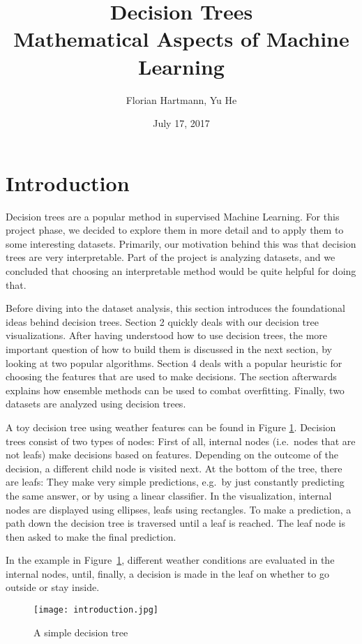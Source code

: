\documentclass[a4paper]{article}
\title{Decision Trees\\\large{Mathematical Aspects of Machine Learning}}
\author{Florian Hartmann, Yu He}
\date{July 17, 2017}
\begin{document}
\maketitle

\section{Introduction}

Decision trees are a popular method in supervised Machine Learning. For this project phase, we decided to explore them in more detail and to apply them to some interesting datasets. Primarily, our motivation behind this was that decision trees are very interpretable. Part of the project is analyzing datasets, and we concluded that choosing an interpretable method would be quite helpful for doing that.

Before diving into the dataset analysis, this section introduces the foundational ideas behind decision trees. Section 2 quickly deals with our decision tree visualizations. After having understood how to use decision trees, the more important question of how to build them is discussed in the next section, by looking at two popular algorithms. Section 4 deals with a popular heuristic for choosing the features that are used to make decisions.
The section afterwards explains how ensemble methods can be used to combat overfitting. Finally, two datasets are analyzed using decision trees.

A toy decision tree using weather features can be found in Figure \ref{fig:simple}. Decision trees consist of two types of nodes: First of all, internal nodes (i.e.\ nodes that are not leafs) make decisions based on features. Depending on the outcome of the decision, a different child node is visited next. At the bottom of the tree, there are leafs: They make very simple predictions, e.g.\ by just constantly predicting the same answer, or by using a linear classifier. In the visualization, internal nodes are displayed using ellipses, leafs using rectangles. To make a prediction, a path down the decision tree is traversed until a leaf is reached. The leaf node is then asked to make the final prediction.

In the example in Figure~\ref{fig:simple}, different weather conditions are evaluated in the internal nodes, until, finally, a decision is made in the leaf on whether to go outside or stay inside.

\begin{figure}[h]
	\centering
	\texttt{[image: introduction.jpg]}
    \caption{A simple decision tree}
    \label{fig:simple}
\end{figure}
\end{document}
